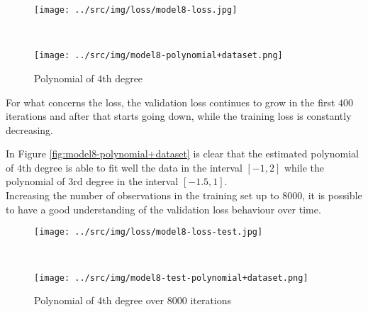 \documentclass[a4paper,12pt]{article} %
\begin{document}
	\begin{figure}[H]
		\begin{minipage}[t]{.5\textwidth}
			\centering
			\texttt{[image: ../src/img/loss/model8-loss.jpg]}
		\end{minipage}
		~
		\begin{minipage}[t]{.5\textwidth}
			\centering
			\texttt{[image: ../src/img/model8-polynomial+dataset.png]}
		\end{minipage}
	\caption{Polynomial of 4th degree}
	\end{figure}

	For what concerns the loss, the validation loss continues to grow in the 
	first $400$ iterations and after that starts going down, while the 
	training loss is constantly decreasing.
	
	In Figure \ref*{fig:model8-polynomial+dataset} is clear that the estimated 
	polynomial of $4\mathrm{th}$ degree is able to fit well the data in 
	the interval $[-1,2]$ while the polynomial of $3\mathrm{rd}$ degree 
	in the interval $[-1.5,1]$.\\
	
	Increasing the number of observations in the training set up to $8000$, it 
	is possible to have a good understanding of the validation loss behaviour 
	over time. 
	
	\begin{figure}[H]
		\begin{minipage}[t]{.5\textwidth}
			\centering
			\texttt{[image: ../src/img/loss/model8-loss-test.jpg]}
		\end{minipage}
		~
		\begin{minipage}[t]{.5\textwidth}
			\centering
			\texttt{[image: ../src/img/model8-test-polynomial+dataset.png]}
		\end{minipage}
	\caption{Polynomial of 4th degree over $8000$ iterations}
	\end{figure}
\end{document}
